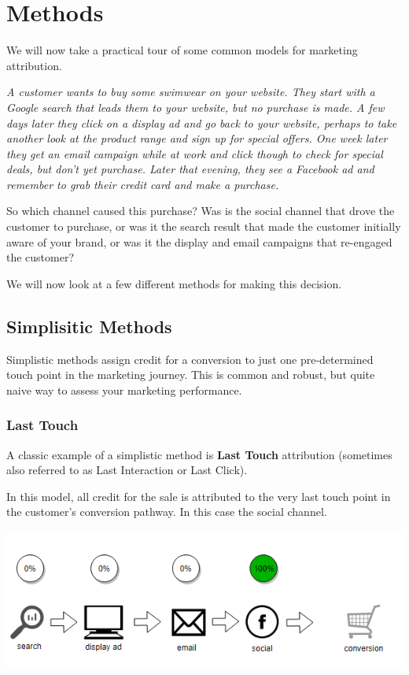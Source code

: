 \documentclass[]{book}
\begin{document}
\hypertarget{methods}{%
\chapter{Methods}\label{methods}}

We will now take a practical tour of some common models for marketing attribution.

\emph{A customer wants to buy some swimwear on your website. They start with a Google
search that leads them to your website, but no purchase is made. A few days later
they click on a display ad and go back to your website, perhaps to take another
look at the product range and sign up for special offers. One week later they
get an email campaign while at work and click though to check for special deals,
but don't yet purchase. Later that evening, they see a Facebook ad and remember to grab their
credit card and make a purchase.}

So which channel caused this purchase? Was is the social channel that drove
the customer to purchase, or was it the search result that made the customer
initially aware of your brand, or was it the display and email campaigns that
re-engaged the customer?

We will now look at a few different methods for making this decision.

\hypertarget{simplisitic-methods}{%
\section{Simplisitic Methods}\label{simplisitic-methods}}

Simplistic methods assign credit for a conversion to just one pre-determined
touch point in the marketing journey. This is common and robust, but quite naive
way to assess your marketing performance.

\hypertarget{last-touch}{%
\subsection{Last Touch}\label{last-touch}}

A classic example of a simplistic method is \textbf{Last Touch} attribution (sometimes
also referred to as Last Interaction or Last Click).

In this model, all credit for the sale is attributed to the very last touch point
in the customer's conversion pathway. In this case the social channel.

\includegraphics[width=5.88in]{img/last_touch}
\end{document}
